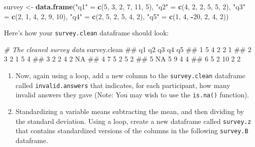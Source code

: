 \documentclass[]{book}
\newenvironment{Shaded}{\begin{snugshade}}{\end{snugshade}}
\newcommand{\KeywordTok}[1]{\textcolor[rgb]{0.13,0.29,0.53}{\textbf{#1}}}
\newcommand{\DecValTok}[1]{\textcolor[rgb]{0.00,0.00,0.81}{#1}}
\newcommand{\StringTok}[1]{\textcolor[rgb]{0.31,0.60,0.02}{#1}}
\newcommand{\CommentTok}[1]{\textcolor[rgb]{0.56,0.35,0.01}{\textit{#1}}}
\newcommand{\OperatorTok}[1]{\textcolor[rgb]{0.81,0.36,0.00}{\textbf{#1}}}
\newcommand{\NormalTok}[1]{#1}
\theoremstyle{definition}
\theoremstyle{definition}
\theoremstyle{remark}
\begin{document}
\begin{Shaded}
\begin{Highlighting}[]
\NormalTok{survey <-}\StringTok{ }\KeywordTok{data.frame}\NormalTok{(}\StringTok{"q1"}\NormalTok{ =}\StringTok{ }\KeywordTok{c}\NormalTok{(}\DecValTok{5}\NormalTok{, }\DecValTok{3}\NormalTok{, }\DecValTok{2}\NormalTok{, }\DecValTok{7}\NormalTok{, }\DecValTok{11}\NormalTok{, }\DecValTok{5}\NormalTok{),}
                     \StringTok{"q2"}\NormalTok{ =}\StringTok{ }\KeywordTok{c}\NormalTok{(}\DecValTok{4}\NormalTok{, }\DecValTok{2}\NormalTok{, }\DecValTok{2}\NormalTok{, }\DecValTok{5}\NormalTok{, }\DecValTok{5}\NormalTok{, }\DecValTok{2}\NormalTok{),}
                     \StringTok{"q3"}\NormalTok{ =}\StringTok{ }\KeywordTok{c}\NormalTok{(}\DecValTok{2}\NormalTok{, }\DecValTok{1}\NormalTok{, }\DecValTok{4}\NormalTok{, }\DecValTok{2}\NormalTok{, }\DecValTok{9}\NormalTok{, }\DecValTok{10}\NormalTok{),}
                     \StringTok{"q4"}\NormalTok{ =}\StringTok{ }\KeywordTok{c}\NormalTok{(}\DecValTok{2}\NormalTok{, }\DecValTok{5}\NormalTok{, }\DecValTok{2}\NormalTok{, }\DecValTok{5}\NormalTok{, }\DecValTok{4}\NormalTok{, }\DecValTok{2}\NormalTok{),}
                     \StringTok{"q5"}\NormalTok{ =}\StringTok{ }\KeywordTok{c}\NormalTok{(}\DecValTok{1}\NormalTok{, }\DecValTok{4}\NormalTok{, }\OperatorTok{-}\DecValTok{20}\NormalTok{, }\DecValTok{2}\NormalTok{, }\DecValTok{4}\NormalTok{, }\DecValTok{2}\NormalTok{))}
\end{Highlighting}
\end{Shaded}

Here's how your \texttt{survey.clean} dataframe should look:

\begin{Shaded}
\begin{Highlighting}[]
\CommentTok{# The cleaned survey data}
\NormalTok{survey.clean}
\NormalTok{##   q1 q2 q3 q4 q5}
\NormalTok{## 1  5  4  2  2  1}
\NormalTok{## 2  3  2  1  5  4}
\NormalTok{## 3  2  2  4  2 NA}
\NormalTok{## 4  7  5  2  5  2}
\NormalTok{## 5 NA  5  9  4  4}
\NormalTok{## 6  5  2 10  2  2}
\end{Highlighting}
\end{Shaded}

\begin{enumerate}
\def\labelenumi{\arabic{enumi}.}
\setcounter{enumi}{2}
\item
  Now, again using a loop, add a new column to the \texttt{survey.clean}
  dataframe called \texttt{invalid.answers} that indicates, for each
  participant, how many invalid answers they gave (Note: You may wish to
  use the \texttt{is.na()} function).
\item
  Standardizing a variable means subtracting the mean, and then dividing
  by the standard deviation. Using a loop, create a new dataframe called
  \texttt{survey.z} that contains standardized versions of the columns
  in the following \texttt{survey.B} dataframe.
\end{enumerate}
\end{document}
